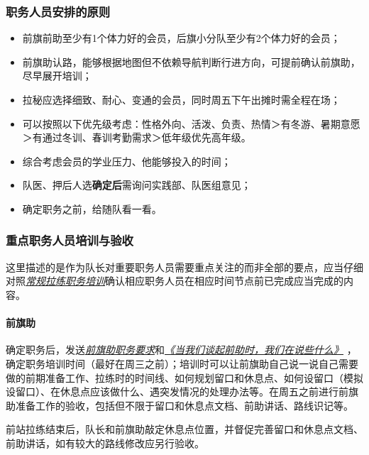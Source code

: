 \documentclass[UTF8]{ctexart}
\begin{document}
\subsubsection{职务人员安排的原则}

\begin{itemize}[nosep,left=2em]
    \item 前旗前助至少有1个体力好的会员，后旗小分队至少有2个体力好的会员；
    \item 前旗助认路，能够根据地图但不依赖导航判断行进方向，可提前确认前旗助，尽早展开培训；
    \item 拉秘应选择细致、耐心、变通的会员，同时周五下午出摊时需全程在场；
    \item 可以按照以下优先级考虑：性格外向、活泼、负责、热情＞有冬游、暑期意愿＞有通过冬训、春训考勤需求＞低年级优先高年级。
    \item 综合考虑会员的学业压力、他能够投入的时间；
    \item 队医、押后人选\textbf{确定后}需询问实践部、队医组意见；
    \item 确定职务之前，给随队看一看。    
\end{itemize}

\subsubsection{重点职务人员培训与验收}

这里描述的是作为队长对重要职务人员需要重点关注的而非全部的要点，应当仔细对照\href{https://chexie.net/bbs/content/?bid=7&tid=1062&p=1}{\textit{常规拉练职务培训}}确认相应职务人员在相应时间节点前已完成应当完成的内容。

\paragraph{前旗助}

确定职务后，发送\href{https://chexie.net/bbs/content/?bid=7&tid=1062&p=1#2}{\textit{前旗助职务要求}}和\href{https://www.chexie.net/bbs/content/?bid=7&tid=879&p=1}{\textit{《当我们谈起前助时，我们在说些什么》}}
，确定职务培训时间（最好在周三之前）；培训时可以让前旗助自己说一说自己需要做的前期准备工作、拉练时的时间线、如何规划留口和休息点、如何设留口（模拟设留口）、在休息点应该做什么、遇突发情况的处理办法等。在周五之前进行前旗助准备工作的验收，包括但不限于留口和休息点文档、前助讲话、路线识记等。

前站拉练结束后，队长和前旗助敲定休息点位置，并督促完善留口和休息点文档、前助讲话，如有较大的路线修改应另行验收。
\end{document}
